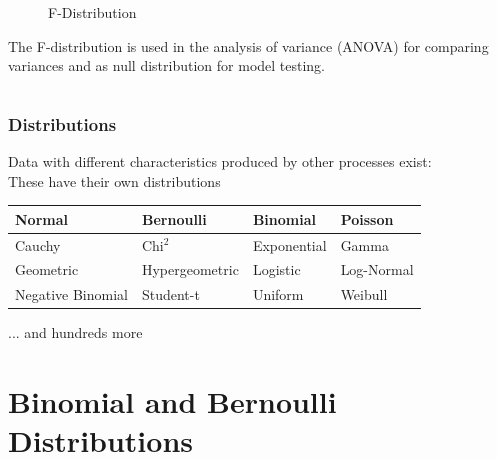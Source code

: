 \documentclass{beamer}
\begin{document}
\begin{frame}[fragile]
\begin{columns}
\begin{column}{0.45\textwidth}
\begin{figure}
            \caption{F-Distribution}
            \end{figure}
            \small
            The F-distribution is used in the analysis of variance (ANOVA) for comparing variances and as null distribution for model testing.
        \end{column}
    \end{columns}
    
\end{frame}

\begin{frame}
    \frametitle{Distributions}
    \large
    Data with different characteristics produced by other processes exist:\\
    These have their own distributions
    \normalsize
    \begin{table}
        \begin{tabular}{|llll|}
        \hline
        Normal & Bernoulli & Binomial & Poisson \\ 
        \hline
        Cauchy & Chi$^2$ & Exponential & Gamma \\
        Geometric & Hypergeometric & Logistic & Log-Normal \\
        Negative Binomial& Student-t & Uniform & Weibull \\
        \hline
\end{tabular}
\end{table}
    \vspace{0.2cm}
    \large
    ... and hundreds more
\end{frame}


\section{Binomial and Bernoulli Distributions}
\end{document}
